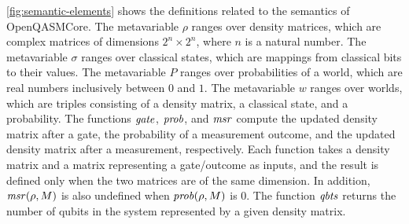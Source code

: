 \noindent
\cref{fig:semantic-elements} shows the definitions related to the semantics of
OpenQASMCore.
%
The metavariable $\rho$ ranges over density matrices, which are complex
matrices of dimensions $2^n\times2^n$, where $n$ is a natural number.
%
The metavariable $\sigma$ ranges over classical states, which are mappings from
classical bits to their values.
%
The metavariable $P$ ranges over probabilities of a world, which are real
numbers inclusively between $0$ and $1$.
%
The metavariable $w$ ranges over worlds, which are triples consisting of a
density matrix, a classical state, and a probability.
%
The functions $\mbox{\emph{gate}}$, $\mbox{\emph{prob}}$, and $\mbox{\emph{msr}}$ compute the
updated density matrix after a gate, the probability of a measurement outcome,
and the updated density matrix after a measurement, respectively.
%
Each function takes a density matrix and a matrix representing a gate/outcome
as inputs, and the result is defined only when the two matrices are of the same
dimension.
%
In addition, $\mbox{\emph{msr}}(\rho,M)$ is also undefined when $\mbox{\emph{prob}}(\rho,M)$ is
$0$.
%
The function $\mbox{\emph{qbts}}$ returns the number of qubits in the system
represented by a given density matrix.

